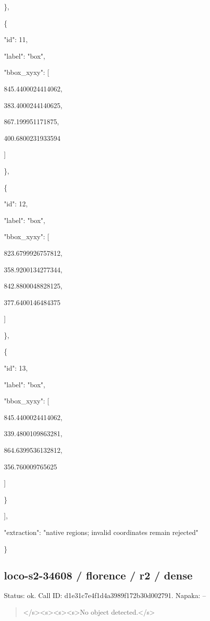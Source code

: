 \documentclass[10pt,a4paper]{article}
\begin{document}
    \},\allowbreak{}\par
    \{\par
      "id":\allowbreak{} 11,\allowbreak{}\par
      "label":\allowbreak{} "box",\allowbreak{}\par
      "bbox\_xyxy":\allowbreak{} [\par
        845.4400024414062,\allowbreak{}\par
        383.4000244140625,\allowbreak{}\par
        867.199951171875,\allowbreak{}\par
        400.6800231933594\par
      ]\par
    \},\allowbreak{}\par
    \{\par
      "id":\allowbreak{} 12,\allowbreak{}\par
      "label":\allowbreak{} "box",\allowbreak{}\par
      "bbox\_xyxy":\allowbreak{} [\par
        823.6799926757812,\allowbreak{}\par
        358.9200134277344,\allowbreak{}\par
        842.8800048828125,\allowbreak{}\par
        377.6400146484375\par
      ]\par
    \},\allowbreak{}\par
    \{\par
      "id":\allowbreak{} 13,\allowbreak{}\par
      "label":\allowbreak{} "box",\allowbreak{}\par
      "bbox\_xyxy":\allowbreak{} [\par
        845.4400024414062,\allowbreak{}\par
        339.4800109863281,\allowbreak{}\par
        864.6399536132812,\allowbreak{}\par
        356.760009765625\par
      ]\par
    \}\par
  ],\allowbreak{}\par
  "extraction":\allowbreak{} "native regions; invalid coordinates remain rejected"\par
\}
\subsection*{loco-s2-34608 / florence / r2 / dense}
Status: ok. Call ID: d1e31c7e4f1d4a3989f172b30d002791. Napaka: --
\begin{quote}\footnotesize
</s>\allowbreak{}<s>\allowbreak{}<s>\allowbreak{}<s>\allowbreak{}No object detected.</s>\allowbreak{}
\end{quote}
\end{document}
